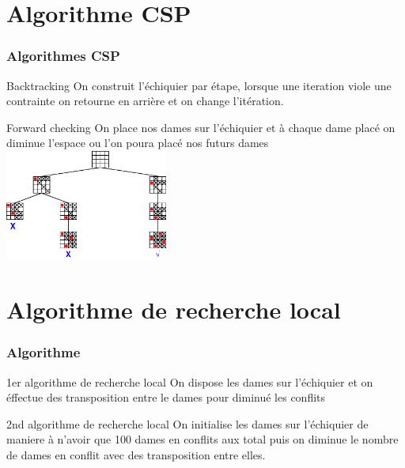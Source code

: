 \documentclass[9pt,a4paper]{beamer}
\begin{document}
\section{Algorithme CSP}
\begin{frame}
	\frametitle{Algorithmes CSP}

	\begin{block}{Backtracking}
		On construit l'échiquier par étape, lorsque une iteration viole une contrainte on retourne en arrière et on change l'itération.
	\end{block}



	\begin{block}{Forward checking}
		On place nos dames sur l'échiquier et à chaque dame placé on diminue l'espace ou l'on poura placé nos futurs dames \\
		\includegraphics[width=0.4\textwidth]{images/forw.png}
	\end{block}

\end{frame}


\section{Algorithme de recherche local}
\begin{frame}
	\frametitle{Algorithme}

	\begin{block}{1er algorithme de recherche local}
		On dispose les dames sur l'échiquier et on éffectue des transposition entre le dames pour diminué les conflits
	\end{block}

	\begin{block}{2nd algorithme de recherche local}
		On initialise les dames sur l'échiquier de maniere à n'avoir que 100 dames en conflits aux total puis on diminue le nombre de dames en conflit avec des transposition entre elles.
	\end{block}


\end{frame}
\end{document}
